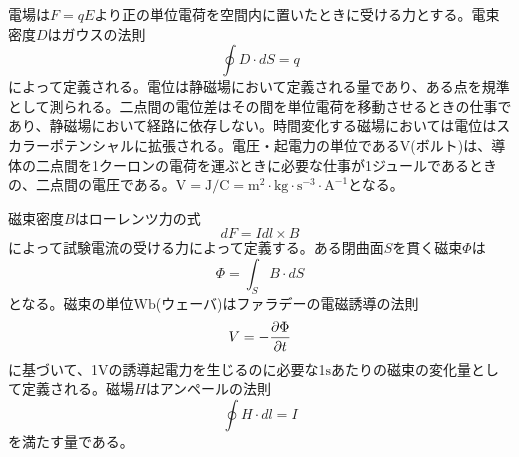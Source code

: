     電場は$F = qE$より正の単位電荷を空間内に置いたときに受ける力とする。電束密度$D$はガウスの法則
        \[\oint D \cdot dS = q\]
    によって定義される。電位は静磁場において定義される量であり、ある点を規準として測られる。二点間の電位差はその間を単位電荷を移動させるときの仕事であり、静磁場において経路に依存しない。時間変化する磁場においては電位はスカラーポテンシャルに拡張される。電圧・起電力の単位である$\mathrm{V}$(ボルト)は、導体の二点間を1クーロンの電荷を運ぶときに必要な仕事が1ジュールであるときの、二点間の電圧である。$\mathrm{V} = \mathrm{J} / \mathrm{C} = \mathrm{m}^2 \cdot \mathrm{kg} \cdot \mathrm{s}^{-3} \cdot \mathrm{A}^{-1}$となる。

    磁束密度$B$はローレンツ力の式
        \[dF = Idl \times B\]
    によって試験電流の受ける力によって定義する。ある閉曲面$S$を貫く磁束$\Phi$は
        \[\Phi = \int_S B \cdot dS\]
    となる。磁束の単位$\mathrm{Wb}$(ウェーバ)はファラデーの電磁誘導の法則
        \[V = -\pd[\Phi]{t}\]
    に基づいて、1$\mathrm{V}$の誘導起電力を生じるのに必要な1$\mathrm{s}$あたりの磁束の変化量として定義される。磁場$H$はアンペールの法則
        \[\oint H \cdot dl = I\]
    を満たす量である。
